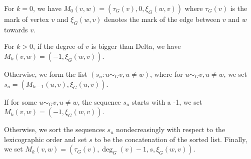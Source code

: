\begin{DoxyItemize}
\item For $k = 0$, we have $M_0(v,w) = (\tau_G(v), 0,\xi_G(w,v))$ where $\tau_G(v)$ is the mark of vertex $v$ and $\xi_G(w,v)$ denotes the mark of the edge between $v$ and $w$ towards $v$.
\item For $k > 0$, if the degree of $v$ is bigger than Delta, we have $M_k(v,w) = (-1,\xi_G(w,v))$.
\item Otherwise, we form the list $(s_u: u \sim_G v, u \neq w)$, where for $u \sim_G v, u \neq w$, we set $s_u = (M_{k-1}(u,v), \xi_G(u,v))$.
\item If for some $u \sim_G v, u \neq w$, the sequence $s_u$ starts with a -\/1, we set $M_k(v,w) = (-1,\xi_G(w,v))$.
\item Otherwise, we sort the sequences $s_u$ nondecreasingly with respect to the lexicographic order and set $s$ to be the concatenation of the sorted list. Finally, we set $M_k(v,w) = (\tau_G(v), \deg_G(v) -1, s, \xi_G(w,v))$. 
\end{DoxyItemize}
